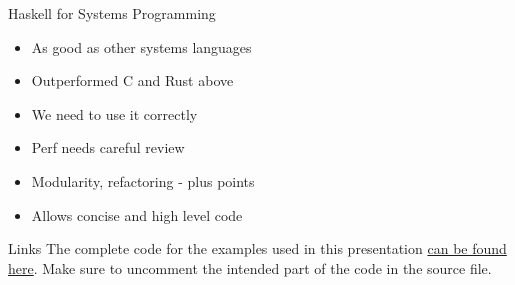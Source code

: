 \documentclass[17pt]{beamer}
\begin{document}
\begin{frame}{Haskell for Systems Programming}{}
\begin{itemize}
  \item As good as other systems languages
  \item Outperformed C and Rust above
  \item We need to use it correctly
  \item Perf needs careful review
  \item Modularity, refactoring - plus points
  \item Allows concise and high level code
\end{itemize}
\end{frame}

\begin{frame}{Links}
  The complete code for the examples used in this presentation
  \href{https://github.com/composewell/streamly-examples/blob/aec56f4e4481e97330aa5ce4324cd1a2d2b3c2bd/examples/ListDir.hs}
  {can be found here}. Make sure to uncomment the intended part of the code in
  the source file.
\end{frame}

\begin{frame}{}
\end{frame}

\end{document}
